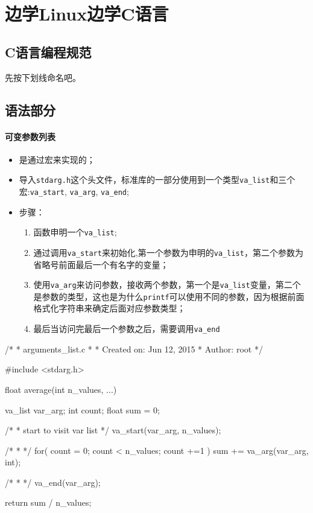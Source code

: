 \chapter{边学Linux边学C语言}


\section{C语言编程规范}

先按下划线命名吧。

\section{语法部分}


\subsubsection{可变参数列表}


\begin{itemize}
\item 是通过宏来实现的；
\item 导入\lstinline$stdarg.h$这个头文件，标准库的一部分使用到一个类型\lstinline$va_list$和三个宏:\lstinline$va_start$, \lstinline$va_arg$, \lstinline$va_end$;
\item 步骤：
\begin{enumerate}
\item 函数申明一个\lstinline$va_list$;
\item 通过调用\lstinline$va_start$来初始化,第一个参数为申明的\lstinline$va_list$，第二个参数为省略号前面最后一个有名字的变量；
\item 使用\lstinline$va_arg$来访问参数，接收两个参数，第一个是\lstinline$va_list$变量，第二个是参数的类型，这也是为什么\lstinline$printf$可以使用不同的参数，因为根据前面格式化字符串来确定后面对应参数类型；
\item 最后当访问完最后一个参数之后，需要调用\lstinline$va_end$ 
\end{enumerate}

\end{itemize}

\begin{C}
/*
 * arguments_list.c
 *
 *  Created on: Jun 12, 2015
 *      Author: root
 */


#include <stdarg.h>

float average(int n_values, ...)
{
	va_list var_arg;
	int count;
	float sum = 0;

	/*
	 * start to visit var list
	 */
	va_start(var_arg, n_values);

	/*
	 *
	 */
	for( count = 0; count < n_values; count +=1 )
	{
		sum += va_arg(var_arg, int);
	}

	/*
	 *
	 */
	va_end(var_arg);

	return sum / n_values;
}

\end{C}

